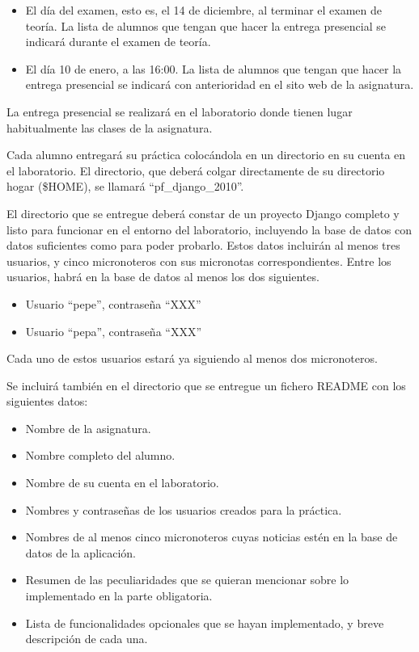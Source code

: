 \begin{itemize}
\item El día del examen, esto es, el 14 de diciembre, al terminar el examen de teoría. La lista de alumnos que tengan que hacer la entrega presencial se indicará durante el examen de teoría.
\item El día 10 de enero, a las 16:00. La lista de alumnos que tengan que hacer la entrega presencial se indicará con anterioridad en el sito web de la asignatura.
\end{itemize}

La entrega presencial se realizará en el laboratorio donde tienen lugar habitualmente las clases de la asignatura.

Cada alumno entregará su práctica colocándola en un directorio en su cuenta en el laboratorio. El directorio, que deberá colgar directamente de su directorio hogar (\$HOME), se llamará ``pf\_django\_2010''.

El directorio que se entregue deberá constar de un proyecto Django completo y listo para funcionar en el entorno del laboratorio, incluyendo la base de datos con datos suficientes como para poder probarlo. Estos datos incluirán al menos tres usuarios, y cinco micronoteros con sus micronotas correspondientes. Entre los usuarios, habrá en la base de datos al menos los dos siguientes.

\begin{itemize}
\item Usuario ``pepe'', contraseña ``XXX''
\item Usuario ``pepa'', contraseña ``XXX''
\end{itemize}

Cada uno de estos usuarios estará ya siguiendo al menos dos micronoteros.

Se incluirá también en el directorio que se entregue un fichero README con los siguientes datos:

\begin{itemize}
\item Nombre de la asignatura.
\item Nombre completo del alumno.
\item Nombre de su cuenta en el laboratorio.
\item Nombres y contraseñas de los usuarios creados para la práctica.
\item Nombres de al menos cinco micronoteros cuyas noticias estén en la base de datos de la aplicación.
\item Resumen de las peculiaridades que se quieran mencionar sobre lo implementado en la parte obligatoria.
\item Lista de funcionalidades opcionales que se hayan implementado, y breve descripción de cada una.
\end{itemize}

